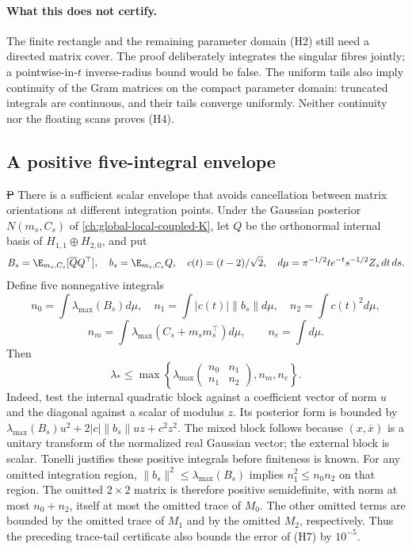 \paragraph{What this does not certify.}
The finite rectangle and the remaining parameter domain (H2) still need
a directed matrix cover. The proof deliberately integrates the singular
fibres jointly; a pointwise-in-$t$ inverse-radius bound would be false.
The uniform tails also imply continuity of the Gram matrices on the
compact parameter domain: truncated integrals are continuous, and their
tails converge uniformly. Neither continuity nor the floating scans
proves (H4).

\subsection{A positive five-integral envelope}
\st{P} There is a sufficient scalar envelope that avoids cancellation
between matrix orientations at different integration points. Under the
Gaussian posterior $N(m_s,C_s)$ of \autoref{ch:global-local-coupled-K}, let $Q$ be the orthonormal
internal basis of $H_{1,1}\oplus H_{2,0}$, and put
\[
 B_s=\E_{m_s,C_s}[\overline Q Q^\top],\quad
 b_s=\E_{m_s,C_s}Q,\quad c(t)=(t-2)/\sqrt2,
 \quad d\mu=\pi^{-1/2}te^{-t}s^{-1/2}Z_s\,dt\,ds.
\]
Define five nonnegative integrals
\[
 n_0=\int\lambda_{\max}(B_s)d\mu,\quad
 n_1=\int|c(t)|\|b_s\|d\mu,\quad n_2=\int c(t)^2d\mu,
\]
\[
 n_m=\int\lambda_{\max}(C_s+m_sm_s^\top)d\mu,\qquad
 n_e=\int d\mu.
\]
Then
\[
 \lambda_*\le\max\left\{
 \lambda_{\max}\begin{pmatrix}n_0&n_1\\n_1&n_2\end{pmatrix},
 n_m,n_e\right\}.\tag{H7}
\]
Indeed, test the internal quadratic block against a coefficient vector
of norm $u$ and the diagonal against a scalar of modulus $z$. Its
posterior form is bounded by
$\lambda_{\max}(B_s)u^2+2|c|\|b_s\|uz+c^2z^2$.
The mixed block follows because $(x,\bar x)$ is a unitary transform of
the normalized real Gaussian vector; the external block is scalar.
Tonelli justifies these positive integrals before finiteness is known.
For any omitted integration region,
$\|b_s\|^2\le\lambda_{\max}(B_s)$ implies
$n_1^2\le n_0n_2$ on that region. The omitted $2\times2$ matrix is
therefore positive semidefinite, with norm at most $n_0+n_2$, itself
at most the omitted trace of $M_0$. The other omitted terms are bounded
by the omitted trace of $M_1$ and by the omitted $M_2$, respectively.
Thus the preceding trace-tail certificate also bounds the error of
(H7) by $10^{-5}$.

